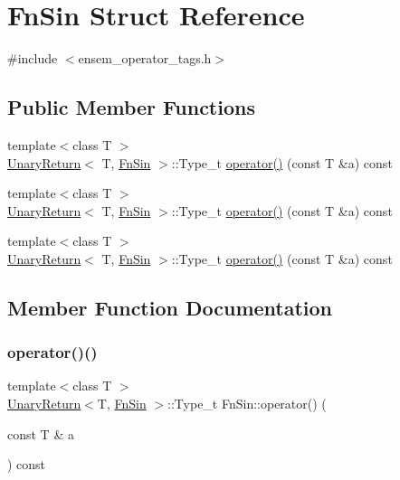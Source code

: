 \hypertarget{structFnSin}{}\section{Fn\+Sin Struct Reference}
\label{structFnSin}


{\ttfamily \#include $<$ensem\+\_\+operator\+\_\+tags.\+h$>$}

\subsection*{Public Member Functions}
\begin{DoxyCompactItemize}
\item 
{\footnotesize template$<$class T $>$ }\\\mbox{\hyperlink{structUnaryReturn}{Unary\+Return}}$<$ T, \mbox{\hyperlink{structFnSin}{Fn\+Sin}} $>$\+::Type\+\_\+t \mbox{\hyperlink{structFnSin_a6aa1709fd8bbba5ccb5a3cba4c5ad601}{operator()}} (const T \&a) const
\item 
{\footnotesize template$<$class T $>$ }\\\mbox{\hyperlink{structUnaryReturn}{Unary\+Return}}$<$ T, \mbox{\hyperlink{structFnSin}{Fn\+Sin}} $>$\+::Type\+\_\+t \mbox{\hyperlink{structFnSin_a6aa1709fd8bbba5ccb5a3cba4c5ad601}{operator()}} (const T \&a) const
\item 
{\footnotesize template$<$class T $>$ }\\\mbox{\hyperlink{structUnaryReturn}{Unary\+Return}}$<$ T, \mbox{\hyperlink{structFnSin}{Fn\+Sin}} $>$\+::Type\+\_\+t \mbox{\hyperlink{structFnSin_a6aa1709fd8bbba5ccb5a3cba4c5ad601}{operator()}} (const T \&a) const
\end{DoxyCompactItemize}


\subsection{Member Function Documentation}
\mbox{\label{structFnSin_a6aa1709fd8bbba5ccb5a3cba4c5ad601}} 
\subsubsection{\texorpdfstring{operator()()}{operator()()}\hspace{0.1cm}{\footnotesize\ttfamily [1/3]}}
{\footnotesize\ttfamily template$<$class T $>$ \\
\mbox{\hyperlink{structUnaryReturn}{Unary\+Return}}$<$T, \mbox{\hyperlink{structFnSin}{Fn\+Sin}} $>$\+::Type\+\_\+t Fn\+Sin\+::operator() (\begin{DoxyParamCaption}\item[{const T \&}]{a }\end{DoxyParamCaption}) const\hspace{0.3cm}{\ttfamily [inline]}}


